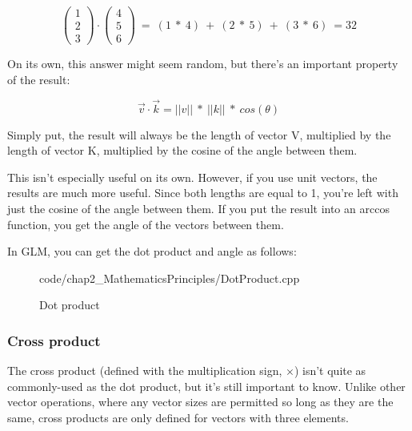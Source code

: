 \begin{equation*}
    \begin{pmatrix}
    1\\
    2\\
    3
    \end{pmatrix} \cdot \begin{pmatrix}
    4\\
    5\\
    6
    \end{pmatrix} \ =\ ( 1\ *\ 4) \ +\ ( 2\ *\ 5) \ +\ ( 3\ *\ 6) \ =32
\end{equation*}

On its own, this answer might seem random, but there's an important property of the result:

\begin{equation*}
    \vec{v} \cdotp \vec{k} =||v||\ *\ ||k||\ *\ cos( \theta )
\end{equation*}

Simply put, the result will always be the length of vector V, multiplied by the length of vector K, multiplied by the cosine of the angle between them.

This isn't especially useful on its own. However, if you use unit vectors, the results are much more useful. Since both lengths are equal to 1, you're left with just the cosine of the angle between them. If you put the result into an arccos function, you get the angle of the vectors between them.

In GLM, you can get the dot product and angle as follows:

\begin{figure}[ht]
    \centering
    \colorbox{backgroundcolor}{
        \parbox{0.9\textwidth}{
            
            {code/chap2_MathematicsPrinciples/DotProduct.cpp}
        }
    }
    \caption{Dot product}
    \label{fig:dot_product}
\end{figure}

\subsubsection{\textsf{Cross product}}
The cross product (defined with the multiplication sign, $\times$) isn't quite as commonly-used as the dot product, but it's still important to know. Unlike other vector operations, where any vector sizes are permitted so long as they are the same, cross products are only defined for vectors with three elements.

